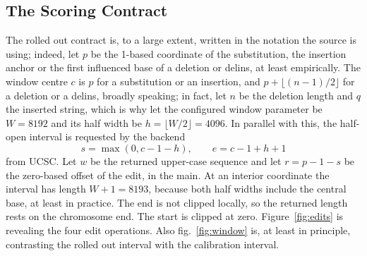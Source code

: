 \documentclass[10pt,journal]{IEEEtran}
\begin{document}
\subsection{The Scoring Contract}
The rolled out contract is, to a large extent, written in the notation the source is using; indeed, let $p$ be the 1-based coordinate of the substitution, the insertion anchor or the first influenced base of a deletion or delins, at least empirically. The window centre $c$ is $p$ for a substitution or an insertion, and $p+\lfloor(n-1)/2\rfloor$ for a deletion or a delins, broadly speaking; in fact, let $n$ be the deletion length and $q$ the inserted string, which is why let the configured window parameter be $W=8192$ and its half width be $h=\lfloor W/2\rfloor=4096$. In parallel with this, the half-open interval is requested by the backend
\begin{equation}
s=\max(0,c-1-h), \qquad e=c-1+h+1
\label{eq:window}
\end{equation}
from UCSC. Let $w$ be the returned upper-case sequence and let $r=p-1-s$ be the zero-based offset of the edit, in the main. At an interior coordinate the interval has length $W+1=8193$, because both half widths include the central base, at least in practice. The end is not clipped locally, so the returned length rests on the chromosome end. The start is clipped at zero. Figure~\ref{fig:edits} is revealing the four edit operations. Also fig.~\ref{fig:window} is, at least in principle, contrasting the rolled out interval with the calibration interval.
\end{document}
